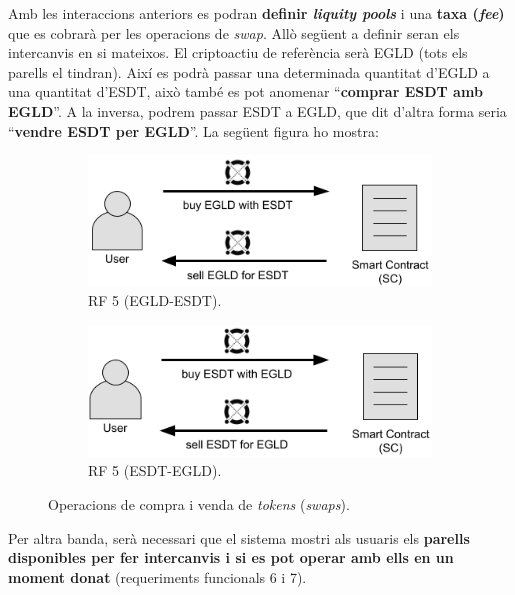 \documentclass[11pt,a4paper]{article}
\begin{document}
Amb les interaccions anteriors es podran \textbf{definir \textit{liquity pools}} i una \textbf{taxa (\textit{fee})} que es cobrarà per les operacions de \textit{swap}. Allò següent a definir seran els intercanvis en si mateixos. El criptoactiu de referència serà EGLD (tots els parells el tindran). Així es podrà passar una determinada quantitat d'EGLD a una quantitat d'ESDT, això també es pot anomenar ``\textbf{comprar ESDT amb EGLD}''. A la inversa, podrem passar ESDT a EGLD, que dit d'altra forma seria ``\textbf{vendre ESDT per EGLD}''. La següent figura ho mostra:
\begin{figure}[!htb]
\begin{subfigure}[b]{0.49\textwidth}
  \includegraphics[width=\linewidth]{cu_buy_sell2.png}
  \caption{RF 5 (EGLD-ESDT).}\label{fig:buysell1}
\end{subfigure}\hfill
\begin{subfigure}[b]{0.49\textwidth}
  \includegraphics[width=\linewidth]{cu_buy_sell1.png}
  \caption{RF 5 (ESDT-EGLD).}\label{fig:buysell2}
\end{subfigure}\hfill
\caption{Operacions de compra i venda de \textit{tokens} (\textit{swaps}).}
\end{figure}

Per altra banda, serà necessari que el sistema mostri als usuaris els \textbf{parells disponibles per fer intercanvis i si es pot operar amb ells en un moment donat} (requeriments funcionals 6 i 7).
\end{document}
